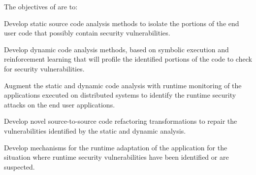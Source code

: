 \addtocounter{wpno}{1}
\begin{Workpackage}{\thewpno}
\WPTitle{\wpname{\thewpno}}



\begin{WPObjectives}
The objectives of \theWP{} are to:
\begin{compactitem}
\item Develop static source code analysis methods to isolate the portions of the end user code that possibly contain security vulnerabilities.
\item Develop dynamic code analysis methods, based on symbolic execution and reinforcement learning that will profile the identified portions of the code to check for security vulnerabilities.
\item Augment the static and dynamic code analysis with runtime monitoring of the applications executed on distributed systems to identify the runtime security attacks on the end user applications.
\item Develop novel source-to-source code refactoring transformations to repair the vulnerabilities identified by the static and dynamic analysis.
\item Develop mechanisms for the runtime adaptation of the application for the situation where runtime security vulnerabilities have been identified or are suspected.
\end{compactitem}
\end{WPObjectives}


\end{Workpackage}
